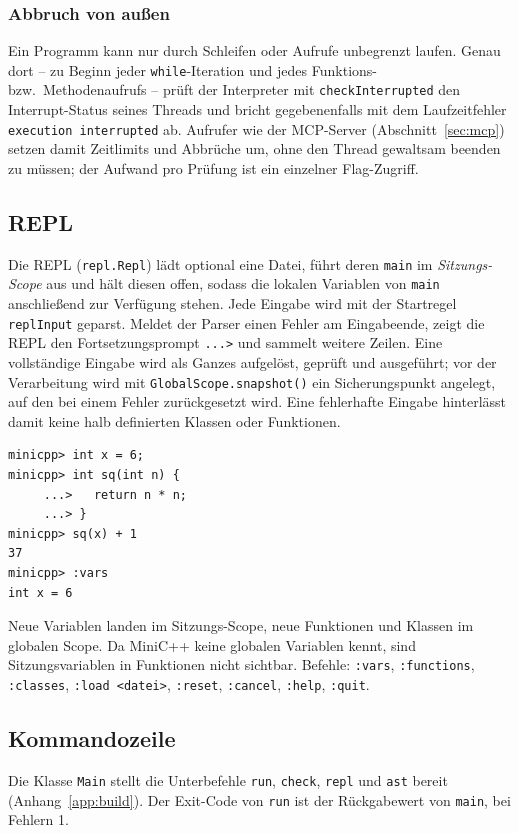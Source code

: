 \documentclass[11pt,a4paper,parskip=half,headsepline,toc=flat]{scrartcl}
\newcommand{\code}[1]{\texttt{#1}}
\begin{document}
\subsubsection*{Abbruch von außen}
Ein Programm kann nur durch Schleifen oder Aufrufe unbegrenzt laufen. Genau dort -- zu Beginn jeder
\code{while}-Iteration und jedes Funktions- bzw.\ Methodenaufrufs -- prüft der Interpreter mit
\code{checkInterrupted} den Interrupt-Status seines Threads und bricht gegebenenfalls mit dem Laufzeitfehler
\code{execution interrupted} ab. Aufrufer wie der MCP-Server (Abschnitt~\ref{sec:mcp}) setzen damit Zeitlimits und
Abbrüche um, ohne den Thread gewaltsam beenden zu müssen; der Aufwand pro Prüfung ist ein einzelner Flag-Zugriff.

\subsection{REPL}
Die REPL (\code{repl.Repl}) lädt optional eine Datei, führt deren \code{main} im \emph{Sitzungs-Scope} aus und hält
diesen offen, sodass die lokalen Variablen von \code{main} anschließend zur Verfügung stehen. Jede Eingabe wird mit
der Startregel \code{replInput} geparst. Meldet der Parser einen Fehler am Eingabeende, zeigt die REPL den
Fortsetzungsprompt \code{...>} und sammelt weitere Zeilen. Eine vollständige Eingabe wird als Ganzes aufgelöst,
geprüft und ausgeführt; vor der Verarbeitung wird mit \code{GlobalScope.snapshot()} ein Sicherungspunkt angelegt, auf
den bei einem Fehler zurückgesetzt wird. Eine fehlerhafte Eingabe hinterlässt damit keine halb definierten Klassen
oder Funktionen.

\begin{lstlisting}[caption={REPL-Sitzung}]
minicpp> int x = 6;
minicpp> int sq(int n) {
     ...>   return n * n;
     ...> }
minicpp> sq(x) + 1
37
minicpp> :vars
int x = 6
\end{lstlisting}

Neue Variablen landen im Sitzungs-Scope, neue Funktionen und Klassen im globalen Scope. Da MiniC++ keine globalen
Variablen kennt, sind Sitzungsvariablen in Funktionen nicht sichtbar. Befehle: \code{:vars}, \code{:functions},
\code{:classes}, \code{:load <datei>}, \code{:reset}, \code{:cancel}, \code{:help}, \code{:quit}.

\subsection{Kommandozeile}
Die Klasse \code{Main} stellt die Unterbefehle \code{run}, \code{check}, \code{repl} und \code{ast} bereit
(Anhang~\ref{app:build}). Der Exit-Code von \code{run} ist der Rückgabewert von \code{main}, bei Fehlern 1.
\end{document}
